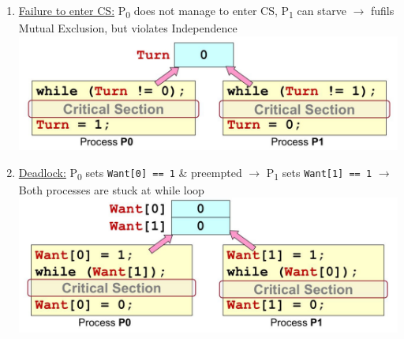 \documentclass[landscape]{article}
\begin{document}
\begin{multicols*}{6}
\begin{itemize}
\begin{enumerate}
        \item \underline{Failure to enter CS:} P\textsubscript{0} does not manage to enter CS, P\textsubscript{1} can starve $\rightarrow$ fufils Mutual Exclusion, but violates Independence
        \includegraphics[width=0.9\linewidth]{4_attempt3.jpg}
        \item \underline{Deadlock:} P\textsubscript{0} sets \verb|Want[0] == 1| \& preempted $\rightarrow$ P\textsubscript{1} sets \verb|Want[1] == 1| $\rightarrow$ Both processes are stuck at while loop
        \includegraphics[width=0.9\linewidth]{5_attempt4.jpg}
      \end{enumerate}
    \end{itemize}

\end{multicols*}
\end{document}
